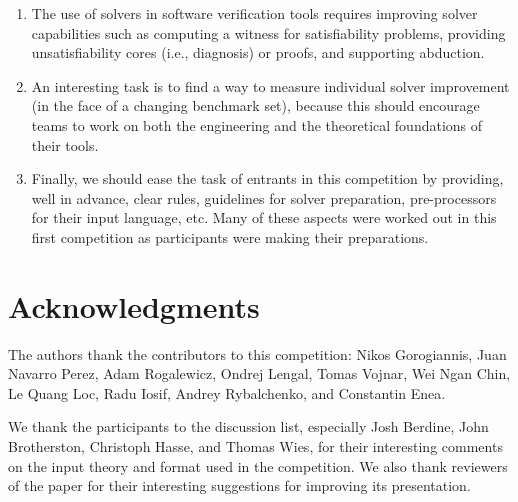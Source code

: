 \documentclass[twoside,11pt]{article}
\begin{document}
\begin{enumerate}
\item The use of solvers in software verification tools requires improving solver capabilities such as
computing a witness for satisfiability problems,
providing unsatisfiability cores (i.e., diagnosis) or proofs,
and supporting abduction.

\item An interesting task is to find a way to measure individual solver improvement (in the face of a changing benchmark set), because this should encourage teams to work on both the engineering and the theoretical foundations of their tools.
% 

\item Finally, we should ease the task of entrants in this competition by providing, well in advance, clear rules, guidelines for solver preparation, pre-processors for their input language, etc. Many of these aspects were worked out in this first competition as participants were making their preparations.

\end{enumerate}


\section*{Acknowledgments}

The authors thank the contributors to this competition:
Nikos Gorogiannis, 
Juan Navarro Perez, 
Adam Rogalewicz, Ondrej Lengal, Tomas Vojnar, 
Wei Ngan Chin, Le Quang Loc, 
Radu Iosif, 
Andrey Rybalchenko, and
Constantin Enea.

We thank the  participants to the discussion list, especially 
Josh Berdine, John Brotherston, Christoph Hasse, and Thomas Wies, 
for their interesting comments on the input theory and format used in the competition.
We also thank reviewers of the paper for their interesting suggestions for improving its presentation.





\end{document}
